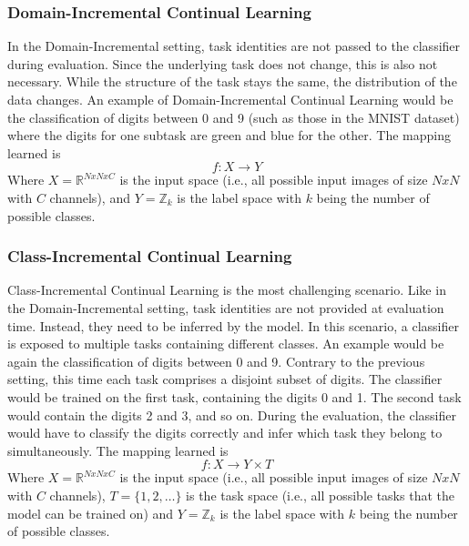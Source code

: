 \subsubsection{Domain-Incremental Continual Learning}
\label{sec:DomainIncrementalContinualLearning}
In the Domain-Incremental setting, task identities are not passed to the classifier during evaluation. Since the underlying task does not change, this is also not necessary.
While the structure of the task stays the same,  the distribution of the data changes. An example of Domain-Incremental Continual Learning would be the classification of digits
between 0 and 9 (such as those in the MNIST \cite{mnist_web} dataset) where the digits for one subtask are green and blue for the other. The mapping learned is 
\begin{equation}
    f: X \rightarrow Y
\end{equation}
Where $X = \mathbb{R}^{N x N x C}$ is the input space (i.e., all possible input images of size $N x N$ with $C$ channels), and $Y = \mathbb{Z}_{k}$ is the label space with $k$ being the
number of possible classes.

\subsubsection{Class-Incremental Continual Learning}
\label{sec:ClassIncrementalContinualLearning}
Class-Incremental Continual Learning is the most challenging scenario. Like in the Domain-Incremental setting, task identities are not provided at evaluation time. Instead, they need to
be inferred by the model. In this scenario, a classifier is exposed to multiple tasks containing different classes. An example would be again the classification of digits between 0 and 9.
Contrary to the previous setting, this time each task comprises a disjoint subset of digits. The classifier would be trained on the first task, containing the digits 0 and 1. The second task
would contain the digits 2 and 3, and so on. During the evaluation, the classifier would have to classify the digits correctly and infer which task they belong to simultaneously. 
The mapping learned is  
\begin{equation}
    f: X \rightarrow Y \times T
\end{equation}
Where $X = \mathbb{R}^{N x N x C}$ is the input space (i.e., all possible input images of size $N x N$ with $C$ channels), $T = \{1,2,\ldots\}$ is the task space (i.e., all possible
tasks that the model can be trained on) and $Y = \mathbb{Z}_{k}$ is the label space with $k$ being the number of possible classes.

